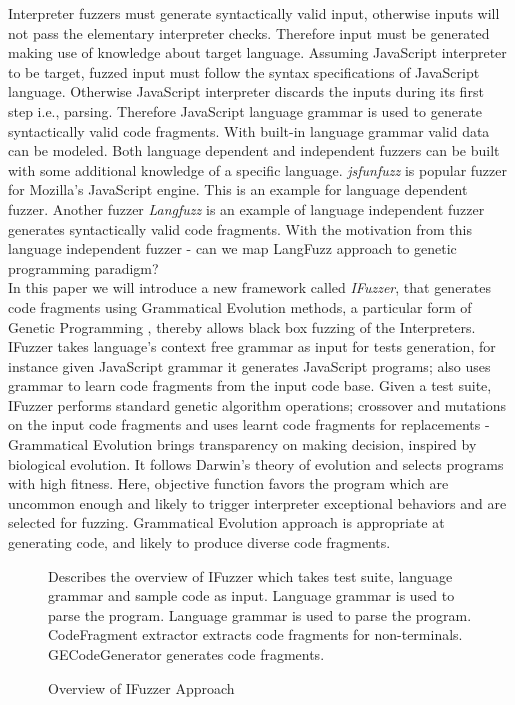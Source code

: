 \documentclass{acm_proc_article-sp}
\begin{document}
\indent Interpreter fuzzers must generate syntactically valid input, otherwise inputs will not pass the elementary interpreter checks. Therefore input must be generated making use of knowledge about target language. Assuming JavaScript interpreter to be target, fuzzed input must follow the syntax specifications of JavaScript language. Otherwise JavaScript interpreter discards the inputs during its first step i.e., parsing. Therefore JavaScript language grammar is used to generate syntactically valid code fragments. With built-in language grammar valid data can be modeled. Both language dependent and independent fuzzers can be built with some additional knowledge of a specific language. \textit{jsfunfuzz} \cite{Jesse07} is popular fuzzer for Mozilla's JavaScript engine. This is an example for language dependent fuzzer. Another fuzzer \textit{Langfuzz} \cite{Holler11} is an example of language independent fuzzer generates syntactically valid code fragments. With the motivation from this language independent fuzzer - can we map LangFuzz approach to genetic programming paradigm?\\
\indent In this paper we will introduce a new framework called \textit{IFuzzer}, that generates code fragments using Grammatical Evolution methods, a particular form of Genetic Programming \cite{Neill_10}, thereby allows black box fuzzing of the Interpreters. IFuzzer takes language's context free grammar as input for tests generation, for instance given JavaScript grammar it generates JavaScript programs; also uses grammar to learn code fragments from the input code base. Given a test suite, IFuzzer performs standard genetic algorithm  operations; crossover and mutations on the input code fragments and uses learnt code fragments for replacements - Grammatical Evolution brings transparency on making decision, inspired by biological evolution. It follows Darwin's theory of evolution and selects programs with high fitness. Here, objective function favors the program which are uncommon enough and likely to trigger interpreter exceptional behaviors and are selected for fuzzing. Grammatical Evolution approach is appropriate at generating code, and likely to produce diverse code fragments.\\

\begin{figure}
\centering
{}
\caption {Overview of IFuzzer Approach}
\medskip
Describes the overview of IFuzzer which takes test suite, language grammar and sample code as input. Language grammar is used to parse the program. Language grammar is used to parse the program. CodeFragment extractor extracts code fragments for non-terminals. GECodeGenerator generates code fragments.
\label{fig1}
\end{figure}
\end{document}
